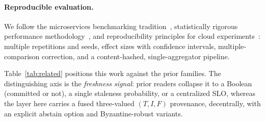 \documentclass[fleqn,10pt]{wlscirep}
\begin{document}
\paragraph{Reproducible evaluation.} We follow the microservices benchmarking
tradition~\cite{gan2019deathstarbench,zhou2021trainticket}, statistically rigorous performance
methodology~\cite{georges2007rigorous}, and reproducibility principles for cloud
experiments~\cite{papadopoulos2021reproducible}: multiple repetitions and seeds, effect sizes with
confidence intervals, multiple-comparison correction, and a content-hashed, single-aggregator
pipeline.

Table~\ref{tab:related} positions this work against the prior families. The distinguishing axis is the
\emph{freshness signal}: prior readers collapse it to a Boolean (committed or not), a single staleness
probability, or a centralized SLO, whereas the layer here carries a fused three-valued
$(T,I,F)$ provenance, decentrally, with an explicit abstain option and Byzantine-robust variants.

\begin{table}[t]
\centering
\caption{Where the neutrosophic freshness layer sits relative to prior approaches to global-state
reads. ``Abstain'' = can decline to act under uncertainty; ``Decentralized'' = no coordinating leader.}
\label{tab:related}
\small
{}
\end{table}
\end{document}
